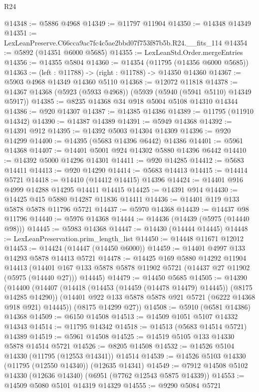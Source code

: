 \begin{lexlean}{R24}
\begin{coremodule}
@14348 := @5886 @4968
@14349 := @11797 @11904
@14350 := @14348 @14349
@14351 := LexLeanPreserve.C66cca9ac7fc4c5ae2bbd07f753f87b5b.R24.__fits_114
@14354 := @5892 (@14351 @6000 @5685)
@14355 := LexLeanStd.Order.mergeEntries
@14356 := @14355 @5804
@14360 := @14354 (@11795 (@14356 @6000 @5685))
@14363 := (left : @11788) -> (right : @11788) -> @14350 @14360
@14367 := @5903 @4968 @14349 @14360 @5110
@14368 := @12072 @11818
@14378 := @14367 @14368 (@5923 (@5933 @4968)) (@5939 (@5940 (@5941 @5110) @14349 @5917))
@14385 := @8235 @14368 @34 @918 @5004 @5108 @14310 @14344
@14386 := @920 @14307
@14387 := @14385 @14386
@14389 := @11795 (@11910 @14342)
@14390 := @14387 @14389
@14391 := @5949 @14368
@14392 := @14391 @912
@14395 := @14392 @5003 @14304 @14309
@14396 := @920 @14299
@14400 := @14395 (@5683 @14396 @6442) @14386
@14401 := @5961 @14368
@14407 := @14401 @5001 @924 @14302 @5880 @14396 @6442
@14410 := @14392 @5000 @14296 @14301
@14411 := @920 @14285
@14412 := @5683 @14411
@14413 := @920 @14290
@14414 := @5683 @14413
@14415 := @14414 @5721
@14418 := @14410 (@14412 @14415) @14396
@14424 := @14401 @916 @4999 @14288 @14295 @14411 @14415
@14425 := @14391 @914
@14430 := @14425 @415 @5880 @14287 @11836 @14411
@14436 := @14401 @119 @133 @5878 @5878 @11796 @5721
@14437 := @5970 @14368
@14439 := @14437 @98 @11796
@14440 := @5976 @14368
@14444 := @14436 (@14439 (@5975 (@14440 @98)))
@14445 := @5983 @14368
@14447 := @14430 (@14444 @14445)
@14448 := LexLeanPreservation.prim_length_list
@14450 := @14448 @11671 @12012
@14453 := @14424 (@14447 (@14450 @6000))
@14459 := @14401 @4997 @133 @14293 @5878 @14413 @5721
@14478 := @14425
    @169
    @5880
    @14292
    @11904
    @14413
    (@14401 @167 @133 @5878 @5878 @11902 @5721 (@14437 @27 @11902 (@5975 (@14440 @27))) @14445)
@14479 := @14450 @5685
@14505 := @14390
    (@14400
      (@14407
        (@14418 (@14453 (@14459 (@14478 @14479) @14445)) (@8175 @14285 @14290))
        (@14401 @922 @133 @5878 @5878 @921 @5721 (@6222 @14368 @918 @921) @14445))
      (@8175 @14299 @27))
@14508 := @5910 (@6581 @14386) @14368
@14509 := @6150 @14508
@14513 := @14509 @1051 @5107 @14332 @14343
@14514 := @11795 @14342
@14518 := @14513 (@5683 @14514 @5721) @14389
@14519 := @5961 @14508
@14525 := @14519 @5105 @133 @14330 @5878 @14514 @5721
@14526 := @8205 @14508
@14532 := @14526 @5104 @14330 (@11795 (@12553 @14341)) @14514
@14539 := @14526 @5103 @14330 (@11795 (@12550 @14340)) (@12635 @14341)
@14549 := @7912 @14508 @5102 @14330 (@12636 @14340) (@6951 (@7762 @12543 @5875 @14339))
@14553 := @14509 @5080 @5101 @14319 @14329
@14555 := @9290 @5084 @5721

\end{coremodule}
\end{lexlean}
